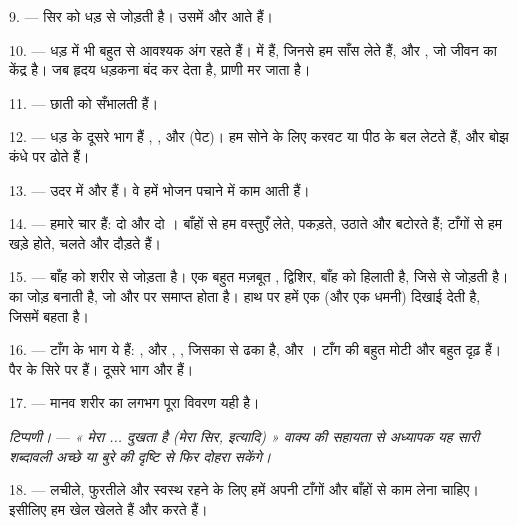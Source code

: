 9. ---  सिर को धड़ से जोड़ती है। उसमें  और
 आते हैं।

10. --- धड़ में भी बहुत से आवश्यक अंग रहते हैं।  में
 हैं, जिनसे हम साँस लेते हैं, और , जो जीवन का
केंद्र है। जब हृदय धड़कना बंद कर देता है, प्राणी मर जाता है।

11. ---  छाती को सँभालती हैं।

12. --- धड़ के दूसरे भाग हैं , ,  और
 (पेट)। हम सोने के लिए करवट या पीठ के बल लेटते हैं, और बोझ कंधे पर
ढोते हैं।

13. --- उदर में  और  हैं। वे हमें भोजन पचाने में
काम आती हैं।

\VUsaut{4.4mm}
\VUsaut{3.0mm}

14. --- हमारे चार  हैं: दो  और दो ।
बाँहों से हम वस्तुएँ लेते, पकड़ते, उठाते और बटोरते हैं; टाँगों से हम खड़े होते,
चलते और दौड़ते हैं।

15. ---  बाँह को शरीर से जोड़ता है। एक बहुत मज़बूत
, द्विशिर, बाँह को हिलाती है, जिसे 
 से जोड़ती है।   का जोड़ बनाती है, जो
 और  पर समाप्त होता है। हाथ पर हमें एक
 (और एक धमनी) दिखाई देती है, जिसमें  बहता है।

16. --- टाँग के भाग ये हैं: ,  और
, , जिसका 
 से ढका है,  और । टाँग की
 बहुत मोटी और बहुत दृढ़ हैं। पैर के सिरे पर
 हैं। दूसरे भाग  और  हैं।

17. --- मानव शरीर का लगभग पूरा विवरण यही है।

\textit{टिप्पणी।} --- \textit{« मेरा ... दुखता है (मेरा सिर, इत्यादि) » वाक्य
की सहायता से अध्यापक यह सारी शब्दावली अच्छे या बुरे} 
\textit{की दृष्टि से फिर दोहरा सकेंगे।}

\VUsaut{5.0mm}
\VUsaut{2.4mm}
\VUsaut{3.0mm}

18. --- लचीले, फुरतीले और स्वस्थ रहने के लिए हमें अपनी टाँगों और बाँहों से काम
लेना चाहिए। इसीलिए हम खेल खेलते हैं और  करते हैं।

